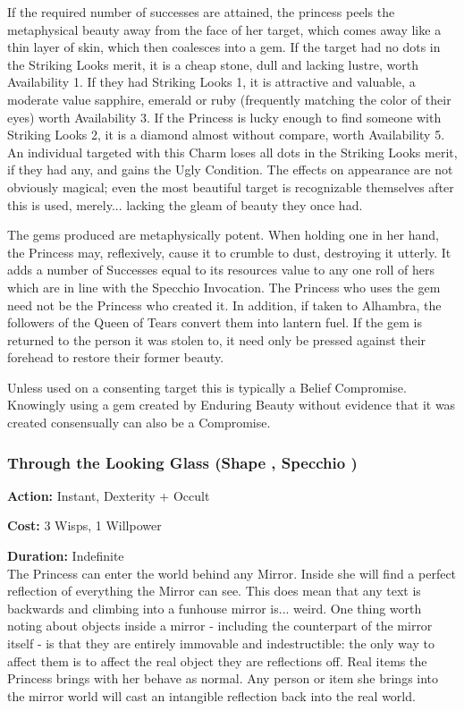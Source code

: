 If the required number of successes are attained, the princess peels the metaphysical beauty away from the face of her target, which comes away like a thin layer of skin, which then coalesces into a gem. If the target had no dots in the Striking Looks merit, it is a cheap stone, dull and lacking lustre, worth Availability 1. If they had Striking Looks 1, it is attractive and valuable, a moderate value sapphire, emerald or ruby (frequently matching the color of their eyes) worth Availability 3. If the Princess is lucky enough to find someone with Striking Looks 2, it is a diamond almost without compare, worth Availability 5. An individual targeted with this Charm loses all dots in the Striking Looks merit, if they had any, and gains the Ugly Condition. The effects on appearance are not obviously magical; even the most beautiful target is recognizable themselves after this is used, merely... lacking the gleam of beauty they once had.

The gems produced are metaphysically potent. When holding one in her hand, the Princess may, reflexively, cause it to crumble to dust, destroying it utterly. It adds a number of Successes equal to its resources value to any one roll of hers which are in line with the Specchio Invocation. The Princess who uses the gem need not be the Princess who created it. In addition, if taken to Alhambra, the followers of the Queen of Tears convert them into lantern fuel. If the gem is returned to the person it was stolen to, it need only be pressed against their forehead to restore their former beauty.

Unless used on a consenting target this is typically a Belief Compromise. Knowingly using a gem created by Enduring Beauty without evidence that it was created consensually can also be a Compromise.
	
\subsubsection*{Through the Looking Glass (Shape \textbullet\textbullet\textbullet\textbullet, Specchio \textbullet\textbullet\textbullet\textbullet\textbullet)}

\noindent \textbf{Action:} Instant, Dexterity + Occult

\noindent \textbf{Cost:} 3 Wisps, 1 Willpower

\noindent \textbf{Duration:} Indefinite \\

\noindent The Princess can enter the world behind any Mirror. Inside she will find a perfect reflection of everything the Mirror can see. This does mean that any text is backwards and climbing into a funhouse mirror is... weird. One thing worth noting about objects inside a mirror - including the counterpart of the mirror itself - is that they are entirely immovable and indestructible: the only way to affect them is to affect the real object they are reflections off. Real items the Princess brings with her behave as normal. Any person or item she brings into the mirror world will cast an intangible reflection back into the real world.

